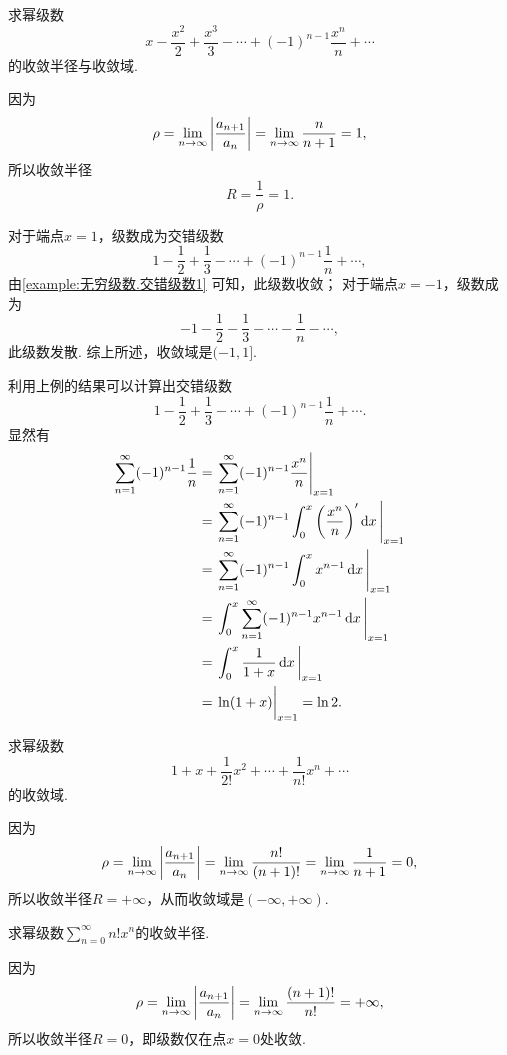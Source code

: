 \begin{example}
求幂级数\[
x-\frac{x^2}{2}+\frac{x^3}{3}-\dotsb+(-1)^{n-1}\frac{x^n}{n}+\dotsb
\]的收敛半径与收敛域.
\begin{solution}
因为\[
\rho = \lim\limits_{n\to\infty} \abs{\frac{a_{n+1}}{a_n}}
= \lim\limits_{n\to\infty} \frac{n}{n+1} = 1,
\]所以收敛半径\[
R = \frac{1}{\rho} = 1.
\]

对于端点\(x=1\)，级数成为交错级数\[
1-\frac{1}{2}+\frac{1}{3}-\dotsb+(-1)^{n-1}\frac{1}{n}+\dotsb,
\]由\cref{example:无穷级数.交错级数1} 可知，此级数收敛；
对于端点\(x=-1\)，级数成为\[
-1-\frac{1}{2}-\frac{1}{3}-\dotsb-\frac{1}{n}-\dotsb,
\]此级数发散.
综上所述，收敛域是\((-1,1]\).
\end{solution}
\end{example}
利用上例的结果可以计算出交错级数\[
1-\frac{1}{2}+\frac{1}{3}-\dotsb+(-1)^{n-1}\frac{1}{n}+\dotsb.
\]显然有
\begin{align*}
\sum\limits_{n=1}^\infty (-1)^{n-1} \frac{1}{n}
&= \eval{\sum\limits_{n=1}^\infty (-1)^{n-1} \frac{x^n}{n}}_{x=1} \\
&= \eval{\sum\limits_{n=1}^\infty (-1)^{n-1} \int_0^x \left(\frac{x^n}{n}\right)' \dd{x}}_{x=1} \\
&= \eval{\sum\limits_{n=1}^\infty (-1)^{n-1} \int_0^x x^{n-1} \dd{x}}_{x=1} \\
&= \eval{\int_0^x \sum\limits_{n=1}^\infty (-1)^{n-1} x^{n-1} \dd{x}}_{x=1} \\
&= \eval{\int_0^x \frac{1}{1+x} \dd{x}}_{x=1} \\
&= \eval{\ln(1+x)}_{x=1} = \ln2.
\end{align*}

\begin{example}
求幂级数\[
1+x+\frac{1}{2!}x^2+\dotsb+\frac{1}{n!}x^n+\dotsb
\]的收敛域.
\begin{solution}
因为\[
\rho = \lim\limits_{n\to\infty} \abs{\frac{a_{n+1}}{a_n}}
= \lim\limits_{n\to\infty} \frac{n!}{(n+1)!}
= \lim\limits_{n\to\infty} \frac{1}{n+1}
= 0,
\]所以收敛半径\(R = +\infty\)，从而收敛域是\((-\infty,+\infty)\).
\end{solution}
\end{example}

\begin{example}
求幂级数\(\sum\limits_{n=0}^\infty n! x^n\)的收敛半径.
\begin{solution}
因为\[
\rho = \lim\limits_{n\to\infty} \abs{\frac{a_{n+1}}{a_n}}
= \lim\limits_{n\to\infty} \frac{(n+1)!}{n!} = +\infty,
\]所以收敛半径\(R = 0\)，即级数仅在点\(x = 0\)处收敛.
\end{solution}
\end{example}

